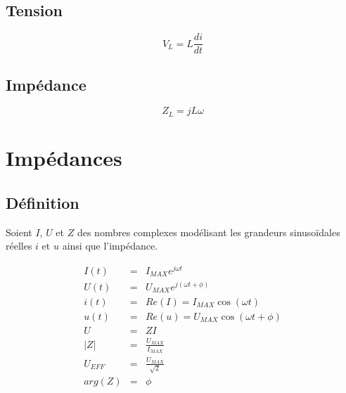\documentclass[a4paper, 11pt]{article}
\begin{document}
        \subsection{Tension}

        $$V_L = L\frac{di}{dt}$$

        \subsection{Impédance}

        $$Z_L = jL\omega$$

    \section{Impédances}

        \subsection{Définition}

        Soient $I$, $U$ et $Z$ des nombres complexes modélisant les grandeurs sinusoïdales réelles $i$ et $u$ ainsi que l'impédance.

        \begin{eqnarray*}
            I(t) & = & I_{MAX}e^{j\omega t}\\
            U(t) & = & U_{MAX}e^{j(\omega t+\phi )} \\
            i(t) & = & Re(I) = I_{MAX}\cos(\omega t) \\
            u(t) & = & Re(u) = U_{MAX}\cos(\omega t + \phi)\\
            U & = & ZI \\
            \left| Z\right| & = & \frac{U_{MAX}}{I_{MAX}} \\
            U_{EFF} & = & \frac{U_{MAX}}{\sqrt{2}}\\
            arg(Z) & = & \phi
        \end{eqnarray*}
\end{document}
